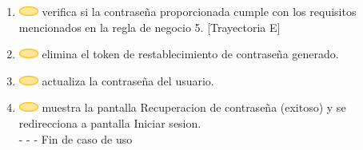 \begin{enumerate}
    \item \includegraphics[width=0.0500\textwidth]{Figuras/sistema.png} verifica si la contraseña proporcionada cumple con los requisitos mencionados en la regla de negocio 5. [Trayectoria E]
    \item \includegraphics[width=0.0500\textwidth]{Figuras/sistema.png} elimina el token de restablecimiento de contraseña generado.
    \item \includegraphics[width=0.0500\textwidth]{Figuras/sistema.png} actualiza la contraseña del usuario.
    \item \includegraphics[width=0.0500\textwidth]{Figuras/sistema.png} muestra la pantalla Recuperacion de contraseña (exitoso) y se redirecciona a pantalla Iniciar sesion.\\
    - - - Fin de caso de uso
\end{enumerate}

